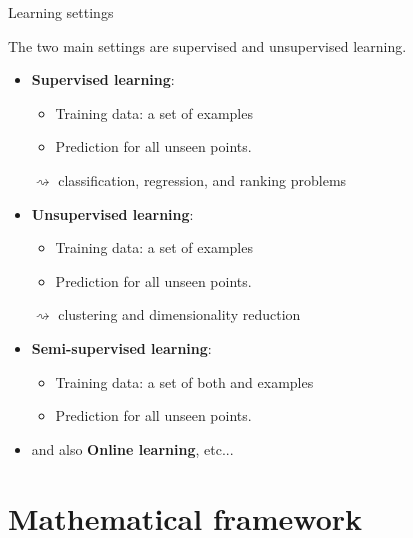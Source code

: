 \documentclass[xcolor={usenames,dvipsnames},handout]{beamer}
\begin{document}
\begin{frame}{Learning settings}





The two main settings are supervised and unsupervised learning.
\begin{itemize}
\item \textbf{Supervised learning}: 
\begin{itemize}
\item Training data: a set of  examples 
\item Prediction for all unseen points. 
\end{itemize}
$\rightsquigarrow$  {\color{Vert}classification, regression, and ranking problems} 
\item \textbf{Unsupervised learning}: 
\begin{itemize}
\item Training data: a set of  examples 
\item Prediction for all unseen points. 
\end{itemize}

$\rightsquigarrow$ {\color{Vert}clustering and dimensionality reduction }

\item \textbf{Semi-supervised learning}:
 \begin{itemize}
\item Training data: a set of both  and  examples 
\item Prediction for all unseen points. 
\end{itemize}
\item and also \textbf{Online learning}, etc...
\end{itemize}

\end{frame}



\section{Mathematical framework}
\end{document}
